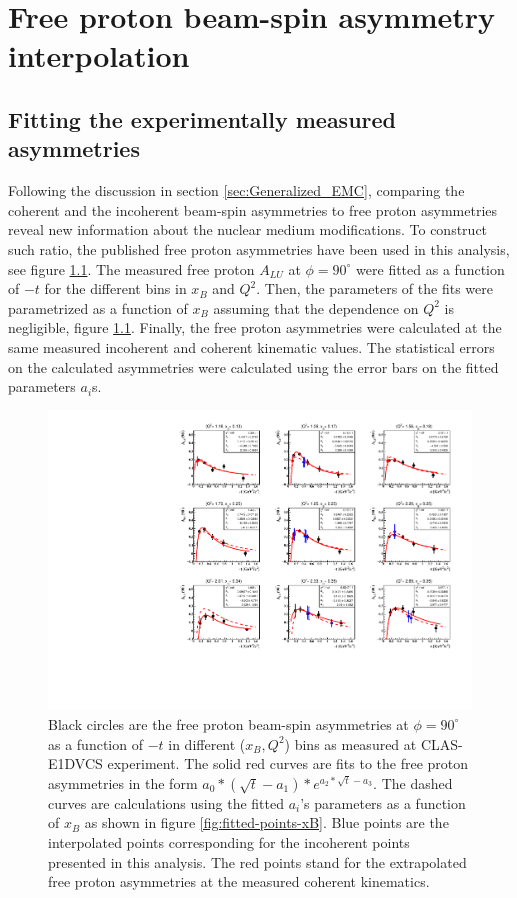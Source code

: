 \chapter{Free proton beam-spin asymmetry interpolation} 
\label{app:free-proton-alu}
\section{Fitting the experimentally measured asymmetries} \label{fit_int} 
Following the discussion in section \ref{sec:Generalized_EMC}, comparing the 
coherent and the incoherent beam-spin asymmetries to free proton asymmetries 
reveal new information about the nuclear medium modifications. To construct 
such ratio, the published free proton asymmetries \cite{FX_BSA} have been used 
in this analysis, see figure \ref{fig:free-proton-alu}. The measured free 
proton $A_{LU}$ at $\phi = 90^{\circ}$ were fitted as a function of $-t$ for 
the different bins in $x_B$ and $Q^2$. Then, the parameters of the fits were 
parametrized as a function of $x_B$ assuming that the dependence on $Q^2$ is 
negligible, figure \ref{fig:free-proton-alu}. Finally, the free proton 
asymmetries were calculated at the same measured incoherent and coherent
kinematic values.  The statistical errors on the calculated asymmetries were 
calculated using the error bars on the fitted parameters $a_{i}$s.\\ 


\begin{figure}[tpb]
\centering
\includegraphics[scale=0.85]{fig_updated/ALU-proton-fits.pdf}
\caption{Black circles are the free proton beam-spin asymmetries at $\phi = 90 
   ^{\circ}$ as a function of $-t$ in different ($x_B, Q^2$) bins as measured 
   at CLAS-E1DVCS experiment. The solid red curves are fits to the free proton 
   asymmetries in the form $a_{0}*(\sqrt{t}-a_{1})*e^{a_{2}*\sqrt{t} - a_{3}}$.  
   The dashed curves are calculations using the fitted $a_{i}$'s parameters as 
a function of $x_B$ as shown in figure \ref{fig:fitted-points-xB}. Blue points 
are the interpolated points corresponding for the incoherent points presented 
in this analysis. The red points stand for the extrapolated free proton 
asymmetries at the measured coherent kinematics.}
\label{fig:free-proton-alu}
\end{figure}

